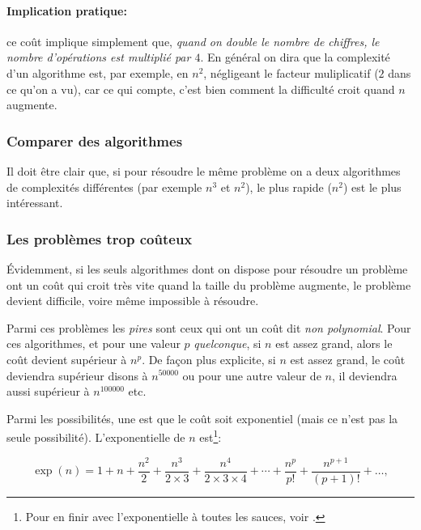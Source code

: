 \paragraph{Implication  pratique:} ce coût implique simplement que,
\emph{quand on double le nombre de chiffres, le nombre d'opérations est
multiplié par $4$}. En général on dira que la complexité d'un
algorithme est, par exemple, en $n^2$, négligeant le facteur
muliplicatif ($2$ dans ce qu'on a vu), car ce qui compte, c'est bien
comment la difficulté croit quand $n$ augmente. 

\smallskip

\noindent{}\medskip



\subsubsection{Comparer des algorithmes} Il doit être clair que, si
pour résoudre le même problème on a deux algorithmes de complexités
différentes (par exemple $n^3$ et $n^2$), le plus rapide ($n^2$) est
le plus intéressant.


\subsubsection{Les problèmes trop coûteux} Évidemment, si les seuls
algorithmes dont on dispose pour résoudre un problème ont un  coût qui
croit très vite quand la taille du problème augmente, le 
problème devient difficile, voire même impossible  à résoudre.

Parmi ces problèmes les \emph{pires} sont ceux qui ont un coût dit
\emph{non polynomial}. Pour ces algorithmes, et pour une valeur $p$
\emph{quelconque}, si $n$ est assez grand, alors le coût devient
supérieur à $n^p$. De façon plus explicite, si $n$ est assez grand, le
coût deviendra supérieur disons à $n^{50000}$ ou pour une autre valeur
de $n$, il deviendra aussi supérieur à $n^{100 000}$ etc.


Parmi les possibilités, une est que le coût soit
exponentiel
(mais ce n'est pas la seule possibilité). L'exponentielle de $n$
est\footnote{Pour en finir avec l'exponentielle à toutes les sauces,
  voir \cite{sarko}.}:

$$\exp(n)= 1+ n + \frac{n^2}{2}+ \frac{n^3}{2 \times 3}+ \frac{n^4}{2
  \times 3 \times 4}+
\cdots+ \frac{n^p}{p!}+ \frac{n^{p+1}}{(p+1)!}+\ldots ,$$

